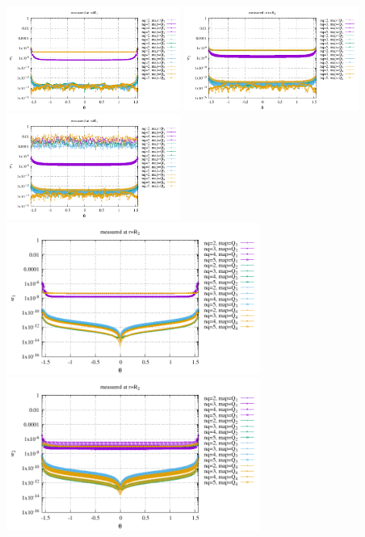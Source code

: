 \begin{center}
\includegraphics[width=5.7cm]{python_codes/fieldstone_152/results/exp1_axisymmetric/sr1_R1}
\includegraphics[width=5.7cm]{python_codes/fieldstone_152/results/exp1_axisymmetric/sr2_R1}
\includegraphics[width=5.7cm]{python_codes/fieldstone_152/results/exp1_axisymmetric/sr3_R1}\\
\includegraphics[width=8.3cm]{python_codes/fieldstone_152/results/exp1_axisymmetric/sr1_R2}
\includegraphics[width=8.3cm]{python_codes/fieldstone_152/results/exp1_axisymmetric/sr2_R2}\\

\end{center}
